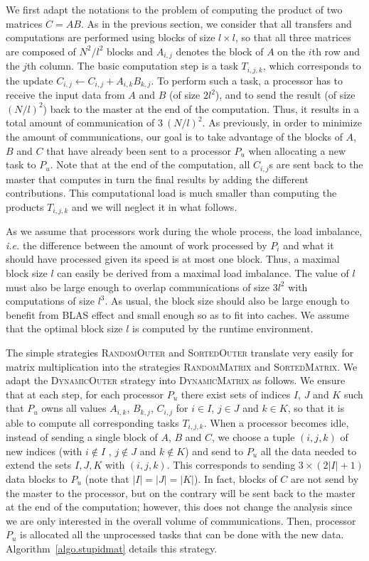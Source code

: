 \documentclass[a4paper,10pt]{article}
\newcommand{\ie}{{\it i.e.}\xspace}
\newcommand{\card}[1]{\ensuremath{|{#1}|}\xspace}
\newcommand{\simplerandom}{\textsc{Random\-Outer}\xspace}
\newcommand{\simplesorted}{\textsc{Sorted\-Outer}\xspace}
\newcommand{\stupid}{\textsc{Dynamic\-Outer}\xspace}
\newcommand{\simplerandommat}{\textsc{Random\-Matrix}\xspace}
\newcommand{\simplesortedmat}{\textsc{Sorted\-Matrix}\xspace}
\newcommand{\stupidmat}{\textsc{Dynamic\-Matrix}\xspace}
\begin{document}
We first adapt the notations to the problem of computing the product
of two matrices $C = A B$. As in the previous section, we consider
that all transfers and computations are performed using blocks of size
$l\times l$, so that all three matrices are composed of $N^2/l^2$
blocks and $A_{i,j}$ denotes the block of $A$ on the $i$th row and the
$j$th column. The basic computation step is a task $T_{i,j,k}$, which
corresponds to the update $C_{i,j} \gets C_{i,j} + A_{i,k}
B_{k,j}$. To perform such a task, a processor has to receive the input
data from $A$ and $B$ (of size $2l^2$), and to send the result (of
size $(N/l)^2$) back to the master at the end of the
computation. Thus, it results in a total amount of communication of
$3~(N/l)^2$. As previously, in order to minimize the amount of
communications, our goal is to take advantage of the blocks of $A$,
$B$ and $C$ that have already been sent to a processor $P_u$ when
allocating a new task to $P_u$. Note that at the end of the
computation, all $C_{i,j}$s are sent back to the master that computes
in turn the final results by adding the different contributions. This
computational load is much smaller than computing the products
$T_{i,j,k}$ and we will neglect it in what follows. 


As we assume that processors work during the whole process, the load
imbalance, \ie the difference between the amount of work processed by
$P_i$ and what it should have processed given its speed is at most one
block. Thus, a maximal block size $l$ can easily be derived from a
maximal load imbalance. The value of $l$ must also be large enough to
overlap communications of size $3 l^2$ with computations of size
$l^3$.  As usual, the block size should also be large enough to
benefit from BLAS effect and small enough so as to fit into caches. We
assume that the optimal block size $l$ is computed by the runtime
environment.
\medskip


The simple strategies \simplerandom and \simplesorted translate very
easily for matrix multiplication into the strategies \simplerandommat
and \simplesortedmat. We adapt the \stupid strategy into \stupidmat as
follows. We ensure that at each step, for each processor $P_u$ there
exist sets of indices $I$, $J$ and $K$ such that $P_u$ owns all values
$A_{i,k}$, $B_{k,j}$, $C_{i,j}$ for $i\in I$, $j\in J$ and $k\in K$,
so that it is able to compute all corresponding tasks
$T_{i,j,k}$. When a processor becomes idle, instead of sending a
single block of $A$, $B$ and $C$, we choose a tuple $(i,j,k)$ of new
indices (with $i\notin I$ , $j\notin J$ and $k\notin K$) and send to
$P_u$ all the data needed to extend the sets $I,J,K$ with
$(i,j,k)$. This corresponds to sending $3\times(2\card{I}+1)$ data blocks to
$P_u$ (note that $\card{I} = \card{J} = \card{K}$). In fact, blocks of
$C$ are not send by the master to the processor, but on the contrary
will be sent back to the master at the end of the computation; however,
this does not change the analysis since we are only interested in the
overall volume of communications. Then, processor $P_u$ is allocated
all the unprocessed tasks that can be done with the new
data. Algorithm~\ref{algo.stupidmat} details this strategy.
\end{document}
